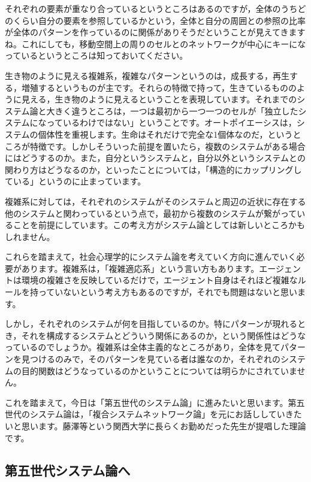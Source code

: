 \documentclass{ltjsbook}
\begin{document}
それぞれの要素が重なり合っているというところはあるのですが，全体のうちどのくらい自分の要素を参照しているかという，全体と自分の周囲との参照の比率が全体のパターンを作っているのに関係がありそうだということが見えてきますね。これにしても，移動空間上の周りのセルとのネットワークが中心にキーになっているというところは知っておいてください。

生き物のように見える複雑系，複雑なパターンというのは，成長する，再生する，増殖するというものが主です。それらの特徴で持って，生きているもののように見える，生き物のように見えるということを表現しています。それまでのシステム論と大きく違うところは，一つは最初から一つ一つのセルが「独立したシステムになっているわけではない」ということです。オートポイエーシスは，システムの個体性を重視します。生命はそれだけで完全な1個体なのだ，というところが特徴です。しかしそういった前提を置いたら，複数のシステムがある場合にはどうするのか。また，自分というシステムと，自分以外というシステムとの関わり方はどうなるのか，といったことについては，「構造的にカップリングしている」というのに止まっています。

複雑系に対しては，それぞれのシステムがそのシステムと周辺の近状に存在する他のシステムと関わっているという点で，最初から複数のシステムが繋がっていることを前提にしています。この考え方がシステム論としては新しいところかもしれません。

これらを踏まえて，社会心理学的にシステム論を考えていく方向に進んでいく必要があります。複雑系は，「複雑適応系」という言い方もあります。エージェントは環境の複雑さを反映しているだけで，エージェント自身はそれほど複雑なルールを持っていないという考え方もあるのですが，それでも問題はないと思います。

しかし，それぞれのシステムが何を目指しているのか。特にパターンが現れるとき，それを構成するシステムとどういう関係にあるのか，という関係性はどうなっているのでしょうか。複雑系は全体主義的なところがあり，全体を見てパターンを見つけるのみで，そのパターンを見ている者は誰なのか，それぞれのシステムの目的関数はどうなっているのかということについては明らかにされていません。

これを踏まえて，今日は「第五世代のシステム論」に進みたいと思います。第五世代のシステム論は，「複合システムネットワーク論」を元にお話ししていきたいと思います。藤澤等という関西大学に長らくお勤めだった先生が提唱した理論です。

\subsection{第五世代システム論へ}
\end{document}
